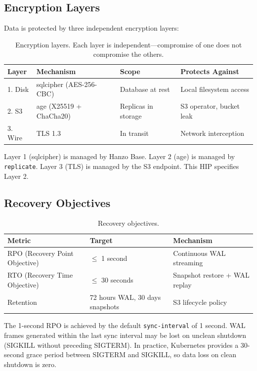 \documentclass[11pt]{article}
\begin{document}
\subsection{Encryption Layers}

Data is protected by three independent encryption layers:

\begin{table}[H]
\centering
\begin{tabular}{@{}llll@{}}
\toprule
\textbf{Layer} & \textbf{Mechanism} & \textbf{Scope} & \textbf{Protects Against} \\
\midrule
1. Disk   & sqlcipher (AES-256-CBC)      & Database at rest     & Local filesystem access \\
2. S3     & age (X25519 + ChaCha20)      & Replicas in storage  & S3 operator, bucket leak \\
3. Wire   & TLS 1.3                       & In transit           & Network interception \\
\bottomrule
\end{tabular}
\caption{Encryption layers. Each layer is independent---compromise of one
does not compromise the others.}
\label{tab:encryption}
\end{table}

Layer 1 (sqlcipher) is managed by Hanzo Base. Layer 2 (age) is managed by
\texttt{replicate}. Layer 3 (TLS) is managed by the S3 endpoint. This HIP
specifies Layer 2.

\subsection{Recovery Objectives}

\begin{table}[H]
\centering
\begin{tabular}{@{}lll@{}}
\toprule
\textbf{Metric} & \textbf{Target} & \textbf{Mechanism} \\
\midrule
RPO (Recovery Point Objective) & $\leq$ 1 second & Continuous WAL streaming \\
RTO (Recovery Time Objective)  & $\leq$ 30 seconds & Snapshot restore + WAL replay \\
Retention                      & 72 hours WAL, 30 days snapshots & S3 lifecycle policy \\
\bottomrule
\end{tabular}
\caption{Recovery objectives.}
\label{tab:recovery}
\end{table}

The 1-second RPO is achieved by the default \texttt{sync-interval} of 1
second. WAL frames generated within the last sync interval may be lost on
unclean shutdown (SIGKILL without preceding SIGTERM). In practice,
Kubernetes provides a 30-second grace period between SIGTERM and SIGKILL, so
data loss on clean shutdown is zero.
\end{document}
